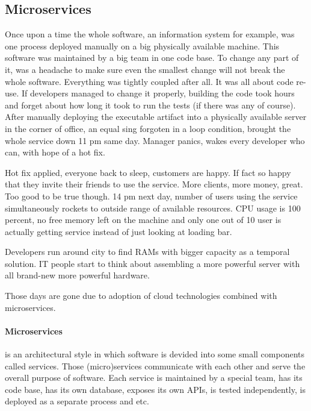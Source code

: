 \documentclass[a4]{report}
\begin{document}
        \subsection{Microservices \cite{microservice-architecture} \cite{microservices-pitfalls} \cite{microservices}}
        Once upon a time the whole software, an information system for example, was one process deployed manually on a big
        physically available machine.
        This software was maintained by a big team in one code base.
        To change any part of it, was a headache to make sure even the smallest change will not break the whole software.
        Everything was tightly coupled after all.
        It was all about code re-use.
        If developers managed to change it properly, building the code took hours and forget about how long it took to
        run the tests (if there was any of course).
        After manually deploying the executable artifact into a physically available server in the corner of office, an
        equal sing forgoten in a loop condition, brought the whole service down 11 pm same day.
        Manager panics, wakes every developer who can, with hope of a hot fix.

        Hot fix applied, everyone back to sleep, customers are happy.
        If fact so happy that they invite their friends to use the service.
        More clients, more money, great.
        Too good to be true though.
        14 pm next day, number of users using the service simultaneously rockets to outside range of available resources.
        CPU usage is 100 percent, no free memory left on the machine and only one out of 10 user is actually getting
        service instead of just looking at loading bar.

        Developers run around city to find RAMs with bigger capacity as a temporal solution.
        IT people start to think about assembling a more powerful server with all brand-new more powerful hardware.

        Those days are gone due to adoption of cloud technologies combined with microservices.

        \paragraph{Microservices} is an architectural style in which software is devided into some small components
        called services.
        Those (micro)services communicate with each other and serve the overall purpose of software.
        Each service is maintained by a special team, has its code base, has its own database, exposes its own APIs, is
        tested independently, is deployed as a separate process and etc.
\end{document}
